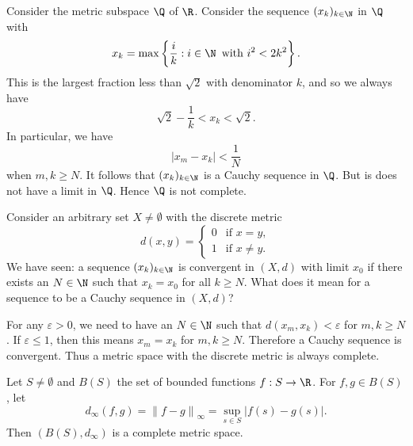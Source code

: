 \np

\begin{example}
Consider the metric subspace $\Q$ of $\R$.
Consider the sequence $(x_k)_{k \in \N}$ in $\Q$ with
\[
x_k = \max\left\{ \frac{i}{k}: i \in \N \,\textrm{ with } i^2 < 2k^2\right\}.
\]
This is the largest fraction less than $\sqrt{2}$ with denominator $k$, and
so we always have
\[
\sqrt{2} - \frac{1}{k} < x_k < \sqrt{2}.
\]
In particular, we have
\[
\left|x_m - x_k\right| < \frac{1}{N}
\]%
when $m,k \ge N$. It follows that $(x_k)_{k \in \N}$ is a Cauchy sequence
in $\Q$. But is does not have a limit in $\Q$.
Hence $\Q$ is not complete.
\end{example}

\np

\begin{example}
Consider an arbitrary set $X \not= \emptyset$ with the discrete metric
\[
d(x,y) = \begin{cases} 0 & \text{if $x = y$}, \\ 1 & \text{if $x \not= y$}. \end{cases}
\]
We have seen: a sequence $(x_k)_{k \in \N}$ is convergent in $(X,d)$ with limit $x_0$ if there
exists an $N \in \N$ such that $x_k = x_0$ for all $k \ge N$.
What does it mean for a sequence to be a Cauchy sequence in $(X,d)$?

For any $\varepsilon > 0$, we need to have an $N \in \N$ such that $d(x_m,x_k) < \varepsilon$
for $m,k \ge N$. If $\varepsilon \le 1$, then this means $x_m = x_k$ for $m,k \ge N$.
Therefore a Cauchy sequence is convergent. Thus a metric space with
the discrete metric is always complete.
\end{example}

\np

\begin{theorem} \label{thm:B}
Let $S\neq \emptyset$ and $B(S)$ the set of bounded functions $f : S \to \R$.
For $f,g \in B(S)$, let
\[
d_\infty(f,g) =\left\|f-g\right\|_\infty = \sup_{s \in S} \left|f(s) - g(s)\right|.
\]%
Then $(B(S),d_\infty)$ is a complete metric space.
\end{theorem}

